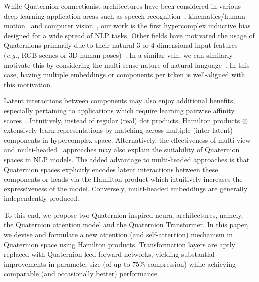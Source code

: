 \documentclass[11pt,a4paper]{article}
\begin{document}

While Quaternion connectionist architectures have been considered in various deep learning application areas such as speech recognition~\cite{parcollet2018quaternion}, kinematics/human motion~\cite{pavllo2018quaternet} and computer vision~\cite{gaudet2017deep}, our work is the first hypercomplex inductive bias designed for a wide spread of NLP tasks. Other fields have motivated the usage of Quaternions primarily due to their natural $3$ or $4$ dimensional input features (\emph{e.g.}, RGB scenes or 3D human poses)~\cite{parcollet2018quaternion, pavllo2018quaternet}. In a similar vein, we can similarly motivate this by considering the multi-sense nature of natural language~\cite{li2015multi,neelakantan2015efficient,huang2012improving}. In this case, having multiple embeddings or components per token is well-aligned with this motivation.

Latent interactions between components may also enjoy additional benefits, especially pertaining to applications which require learning pairwise affinity scores~\cite{parikh2016decomposable,seo2016bidirectional}. Intuitively, instead of regular (real) dot products, Hamilton products $\otimes$ extensively learn representations by matching across multiple (inter-latent) components in hypercomplex space.  Alternatively, the effectiveness of multi-view and multi-headed~\cite{vaswani2017attention} approaches may also explain the suitability of Quaternion spaces in NLP models. The added advantage to multi-headed approaches is that Quaternion spaces explicitly encodes latent interactions between these components or heads via the Hamilton product which intuitively increases the expressiveness of the model. Conversely, multi-headed embeddings are generally independently produced.

To this end, we propose two Quaternion-inspired neural architectures, namely, the Quaternion attention model and the Quaternion Transformer. In this paper, we devise and formulate a new attention (and self-attention) mechanism in Quaternion space using Hamilton products. Transformation layers are aptly replaced with Quaternion feed-forward networks, yielding substantial improvements in parameter size (of up to $75\%$ compression) while achieving comparable (and occasionally better) performance.
\end{document}
